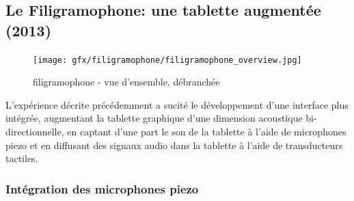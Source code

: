 \subsection{Le Filigramophone: une tablette augmentée (2013)}

\begin{figure}[!htbp]
	\texttt{[image: gfx/filigramophone/filigramophone\_overview.jpg]}
	\caption{filigramophone - vue d'ensemble, débranchée}
	\label{fig:interface:filigramophone}
\end{figure}
\noindent L'expérience décrite précédemment a sucité le développement d'une interface plus intégrée, augmentant la tablette graphique d'une dimension acoustique bi-directionnelle, en captant d'une part le son de la tablette à l'aide de microphones piezo et en diffusant des signaux audio dans la tablette à l'aide de transducteurs tactiles.

\subsubsection{Intégration des microphones piezo}

